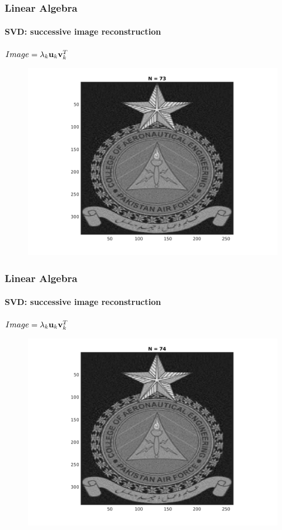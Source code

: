 \documentclass[hyperref={pdfpagelabels=true}]{beamer}
\begin{document}
\begin{frame}
\frametitle{Linear Algebra}
\framesubtitle{SVD: successive image reconstruction} 
\small{
\begin{center}
$Image = \lambda_k{\bf u}_k {\bf v}_k^T$
\end{center}}
\begin{figure}[!htb]
\centering
\includegraphics [scale=0.48]{n/b73.png}
\end{figure}
\end{frame}

\begin{frame}
\frametitle{Linear Algebra}
\framesubtitle{SVD: successive image reconstruction} 
\small{
\begin{center}
$Image = \lambda_k{\bf u}_k {\bf v}_k^T$
\end{center}}
\begin{figure}[!htb]
\centering
\includegraphics [scale=0.48]{n/b74.png}
\end{figure}
\end{frame}
\end{document}
